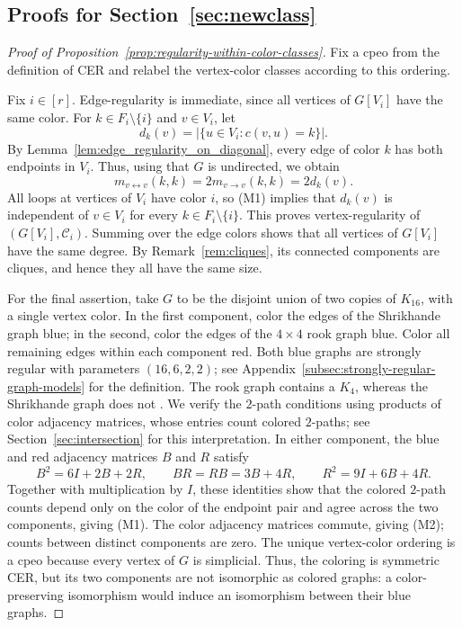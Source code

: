 \documentclass[12pt]{amsart}
\theoremstyle{plain}
\theoremstyle{definition}
\theoremstyle{remark}
\newcommand{\1}{\mathbf{1}}
\begin{document}
\subsection{Proofs for Section~\ref{sec:newclass}}
\begin{proof}[Proof of Proposition~\ref{prop:regularity-within-color-classes}]
Fix a cpeo from the definition of CER and relabel the vertex-color classes
according to this ordering.

Fix $i\in[r]$. Edge-regularity is immediate, since all vertices of
$G[V_i]$ have the same color. For $k\in F_i\setminus\{i\}$ and $v\in V_i$, let
\[
d_k(v)=|\{u\in V_i\colon c(v,u)=k\}|.
\]
By Lemma~\ref{lem:edge_regularity_on_diagonal}, every edge of color $k$
has both endpoints in $V_i$. Thus, using that $G$ is undirected, we obtain
\[
m_{v\leftrightarrow v}(k,k)=2m_{v\to v}(k,k)=2d_k(v).
\]
All loops at vertices of $V_i$ have color $i$, so (M1) implies that $d_k(v)$
is independent of $v\in V_i$ for every $k\in F_i\setminus\{i\}$.
This proves vertex-regularity of $(G[V_i],\mathcal{C}_i)$.
Summing over the edge colors shows that all vertices of $G[V_i]$ have the
same degree. By Remark~\ref{rem:cliques}, its connected components are
cliques, and hence they all have the same size.

For the final assertion, take $G$ to be the disjoint union
of two copies of $K_{16}$, with a single vertex color.
In the first component, color the edges of the Shrikhande graph
blue; in the second, color the edges of the $4\times4$ rook graph blue.
Color all remaining edges within each component red.
Both blue graphs are strongly regular with parameters $(16,6,2,2)$;
see Appendix~\ref{subsec:strongly-regular-graph-models}
for the definition.
The rook graph contains a $K_4$, whereas the Shrikhande graph
does not \citep[Section~10.6]{srg}.
We verify the $2$-path conditions using products of color adjacency matrices,
whose entries count colored $2$-paths; see Section~\ref{sec:intersection}
for this interpretation.
In either component, the blue and red adjacency matrices $B$ and $R$
satisfy
\[
B^2=6I+2B+2R,\qquad
BR=RB=3B+4R,\qquad
R^2=9I+6B+4R.
\]
Together with multiplication by $I$, these identities show that the colored
$2$-path counts depend only on the color of the endpoint pair and agree
across the two components, giving (M1). The color adjacency matrices
commute, giving (M2); counts between distinct components are zero.
The unique vertex-color ordering is a cpeo because every vertex of $G$
is simplicial. Thus, the coloring is symmetric CER, but its two components
are not isomorphic as colored graphs: a color-preserving isomorphism
would induce an isomorphism between their blue graphs.
\end{proof}
\end{document}
